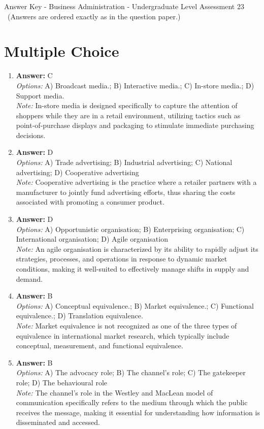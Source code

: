 \documentclass[12pt]{article}
\begin{document}
\begin{center}
Answer Key - Business Administration - Undergraduate Level Assessment 23 \
\small (Answers are ordered exactly as in the question paper.)
\end{center}

\section*{Multiple Choice}
\begin{enumerate}[label=\arabic*.]
\item \textbf{Answer:} C
\\ \textit{Options:} A) Broadcast media.; B) Interactive media.; C) In-store media.; D) Support media.
\\ \textit{Note:} In-store media is designed specifically to capture the attention of shoppers while they are in a retail environment, utilizing tactics such as point-of-purchase displays and packaging to stimulate immediate purchasing decisions.
\item \textbf{Answer:} D
\\ \textit{Options:} A) Trade advertising; B) Industrial advertising; C) National advertising; D) Cooperative advertising
\\ \textit{Note:} Cooperative advertising is the practice where a retailer partners with a manufacturer to jointly fund advertising efforts, thus sharing the costs associated with promoting a consumer product.
\item \textbf{Answer:} D
\\ \textit{Options:} A) Opportunistic organisation; B) Enterprising organisation; C) International organisation; D) Agile organisation
\\ \textit{Note:} An agile organisation is characterized by its ability to rapidly adjust its strategies, processes, and operations in response to dynamic market conditions, making it well-suited to effectively manage shifts in supply and demand.
\item \textbf{Answer:} B
\\ \textit{Options:} A) Conceptual equivalence.; B) Market equivalence.; C) Functional equivalence.; D) Translation equivalence.
\\ \textit{Note:} Market equivalence is not recognized as one of the three types of equivalence in international market research, which typically include conceptual, measurement, and functional equivalence.
\item \textbf{Answer:} B
\\ \textit{Options:} A) The advocacy role; B) The channel's role; C) The gatekeeper role; D) The behavioural role
\\ \textit{Note:} The channel's role in the Westley and MacLean model of communication specifically refers to the medium through which the public receives the message, making it essential for understanding how information is disseminated and accessed.
\end{enumerate}
\end{document}
